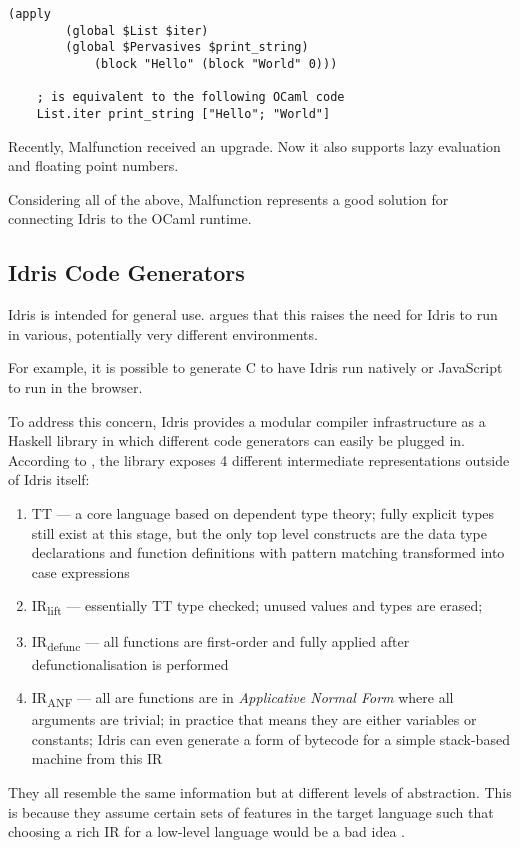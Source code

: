 \begin{lstlisting}[label={lst:mlfforeign}, caption=
    Calling OCaml code from Malfunction]
    (apply
        (global $List $iter)
        (global $Pervasives $print_string)
            (block "Hello" (block "World" 0)))

    ; is equivalent to the following OCaml code
    List.iter print_string ["Hello"; "World"]
\end{lstlisting}
% 

Recently, Malfunction received an upgrade.
Now it also supports lazy evaluation and
floating point numbers.

Considering all of the above, Malfunction represents a good
solution for connecting Idris to the OCaml runtime.

\subsection{Idris Code Generators}
Idris is intended for general use. \citep{crosscompilers} argues
that this raises the need for Idris to run in various, potentially
very different environments.

For example, it is possible to generate C to have Idris run
natively or JavaScript to run in the browser.

To address this concern, Idris provides a modular compiler
infrastructure as a Haskell library in which different code
generators can easily be plugged in.
According to \citep{crosscompilers},
the library exposes 4 different intermediate representations outside
of Idris itself:
\begin{enumerate}
    \item TT --- a core language based on dependent type theory; fully
          explicit types still exist at this stage, but the only top level
          constructs are the data type declarations and function definitions
          with pattern matching transformed into case expressions
    \item IR\textsubscript{lift} --- essentially TT type checked; unused values
          and types are erased;
    \item IR\textsubscript{defunc} --- all functions are first-order
          and fully applied after defunctionalisation is performed
    \item IR\textsubscript{ANF} --- all are functions are in
          \emph{Applicative Normal Form} where all arguments are trivial;
          in practice that means they are either variables or constants;
          Idris can even generate a form of bytecode for a simple
          stack-based machine from this IR
\end{enumerate}
They all resemble the same information but at different levels
of abstraction. This is because they assume certain sets of features
in the target language such that choosing a rich IR
for a low-level language would be a bad idea
\citep{ElliottIdrisErlang}.


